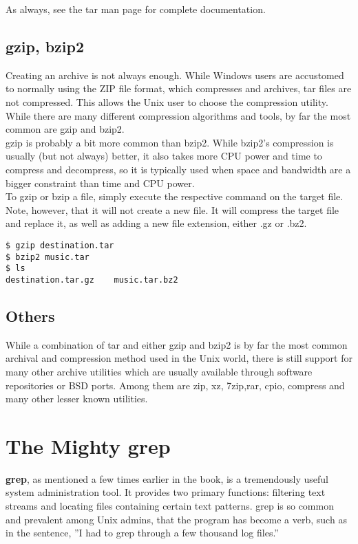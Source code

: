 As always, see the tar man page for complete documentation.

\subsection{gzip, bzip2}

Creating an archive is not always enough.  While Windows users are accustomed to normally using the ZIP file format, which compresses and archives, tar files are not compressed.  This allows the Unix user to choose the compression utility.  While there are many different compression algorithms and tools, by far the most common are gzip and bzip2.\\

gzip is probably a bit more common than bzip2.  While bzip2's compression is usually (but not always) better, it also takes more CPU power and time to compress and decompress, so it is typically used when space and bandwidth are a bigger constraint than time and CPU power.\\

To gzip or bzip a file, simply execute the respective command on the target file.  Note, however, that it will not create a new file. It will compress the target file and replace it, as well as adding a new file extension, either .gz or .bz2.\\

\begin{verbatim}
$ gzip destination.tar
$ bzip2 music.tar
$ ls 
destination.tar.gz    music.tar.bz2
\end{verbatim}

\subsection{Others}

While a combination of tar and either gzip and bzip2 is by far the most common archival and compression method used in the Unix world, there is still support for many other archive utilities which are usually available through software repositories or BSD ports. Among them are zip, xz, 7zip,rar, cpio, compress and many other lesser known utilities.

\section{The Mighty grep}

\textbf{grep}, as mentioned a few times earlier in the book, is a tremendously useful system administration tool.  It provides two primary functions:  filtering text streams and locating files containing certain text patterns. grep is so common and prevalent among Unix admins, that the program has become a verb, such as in the sentence, ”I had to grep through a few thousand log files.”

